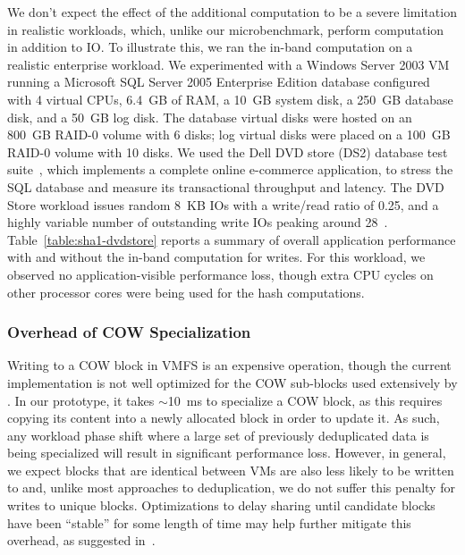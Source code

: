 We don't expect the effect of the additional computation to be a
severe limitation in realistic workloads, which, unlike our
microbenchmark, perform computation in addition to IO.  To illustrate
this, we ran
the in-band \shaone computation on a realistic enterprise workload. We
experimented with a Windows Server 2003 VM running a Microsoft SQL
Server 2005 Enterprise Edition database configured with 4 virtual
CPUs, 6.4~GB of RAM, a 10~GB system disk, a 250~GB database disk, and
a 50~GB log disk.  The database virtual disks were hosted on an 800~GB
RAID-0 volume with 6 disks; log virtual disks were placed on a 100~GB
RAID-0 volume with 10 disks.  We used the Dell DVD store (DS2)
database test suite~\cite{dvdstore}, which implements a complete
online e-commerce application, to stress the SQL database and measure
its transactional throughput and latency.  The DVD
Store workload issues random 8~KB IOs with a write/read ratio of 0.25,
and a highly variable number of outstanding write IOs peaking around
28~\cite{srs-vpact09}.  Table~\ref{table:sha1-dvdstore} reports a
summary of overall application performance with and without the
in-band \shaone computation for writes. For this workload, we
observed no application-visible performance loss, though extra CPU
cycles on other processor cores were being used for the hash
computations.

\subsubsection{Overhead of COW Specialization}

Writing to a COW block in VMFS is an expensive operation, though the
current implementation is not well optimized for the COW sub-blocks
used extensively by \DeDe.  In our prototype, it takes $\sim$10~ms to
specialize a COW block, as this requires copying its content into a
newly allocated
block in order to update it.  As such, any workload phase shift where a
large set of previously deduplicated data is being specialized will
result in significant performance loss.  However, in general, we
expect blocks that are identical between VMs are also less likely to
be written to and, unlike most approaches to deduplication, we do not
suffer this penalty for writes to unique blocks.  Optimizations to
delay sharing until candidate blocks have been ``stable'' for some
length of time may help further mitigate this overhead, as suggested
in~\cite{hong04sandedup}.


